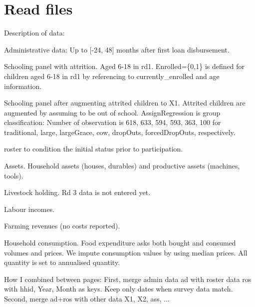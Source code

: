 \section{Read files}





Description of data:
\begin{description}
\vspace{1.0ex}\setlength{\itemsep}{1.0ex}\setlength{\baselineskip}{12pt}
\item[ad]	Administrative data: Up to [-24, 48] months after first loan disbursement.
\item[X1]	Schooling panel with attrition. Aged 6-18 in rd1. \textsf{Enrolled=\{0,1\}} is defined for children aged 6-18 in rd1 by referencing to \textsf{currently\_enrolled} and age information.
\item[X2]	Schooling panel after augmenting attrited children to \textsf{X1}. Attrited children are augmented by assuming to be out of school. \textsf{AssignRegression} is group classification: Number of observation is \textsf{618, 633, 594, 593, 363, 100} for \textsf{traditional, large, largeGrace, cow, dropOuts, forcedDropOuts}, respectively.
\item[ros]	 \textsf{roster} to condition the initial status prior to participation.
\item[ass]	 Assets. Household assets (houses, durables) and productive assets (machines, tools). 
\item[lvo]	Livestock holding. Rd 3 data is not entered yet.
\item[lab]	Labour incomes.
\item[far]	Farming revenues (no costs reported).
\item[con]	Household consumption. Food expenditure asks both bought and consumed volumes and prices. We impute consumption values by using median prices. All quantity is set to annualised quantity.
\end{description}

How I combined between pages: First, merge admin data \textsf{ad} with roster data \textsf{ros} with \textsf{hhid, Year, Month} as keys. Keep only dates when survey data match. Second, merge \textsf{ad+ros} with other data \textsf{X1}, \textsf{X2}, \textsf{ass}, ... 

